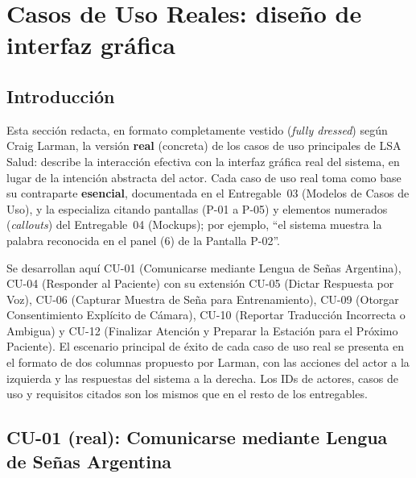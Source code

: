 \section{Casos de Uso Reales: diseño de interfaz gráfica}

\subsection{Introducción}

Esta sección redacta, en formato completamente vestido (\textit{fully
dressed}) según Craig Larman, la versión \textbf{real} (concreta) de los
casos de uso principales de LSA Salud: describe la interacción efectiva con la
interfaz gráfica real del sistema, en lugar de la intención abstracta del
actor.
Cada caso de uso real toma como base su contraparte \textbf{esencial},
documentada en el Entregable~03 (Modelos de Casos de Uso), y la especializa
citando pantallas (P-01 a P-05) y elementos numerados (\emph{callouts})
del Entregable~04 (Mockups); por ejemplo, ``el sistema muestra la palabra
reconocida en el panel (6) de la Pantalla P-02''.

Se desarrollan aquí CU-01 (Comunicarse mediante Lengua de Señas Argentina),
CU-04 (Responder al Paciente) con su extensión CU-05 (Dictar Respuesta por
Voz), CU-06 (Capturar Muestra de Seña para Entrenamiento), CU-09 (Otorgar
Consentimiento Explícito de Cámara), CU-10 (Reportar Traducción Incorrecta
o Ambigua) y CU-12 (Finalizar Atención y Preparar la Estación para el
Próximo Paciente). El escenario principal de éxito de cada caso de uso real
se presenta en el formato de dos columnas propuesto por Larman, con las
acciones del actor a la izquierda y las respuestas del sistema a la
derecha. Los IDs de actores, casos de uso y requisitos citados son los
mismos que en el resto de los entregables.

\subsection{CU-01 (real): Comunicarse mediante Lengua de Señas Argentina}

